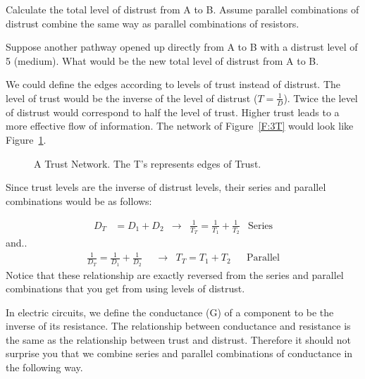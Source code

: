 \begin{blevel}
Calculate the total level of distrust from A to B. Assume parallel combinations of distrust combine the same way as parallel combinations of resistors.
\end{blevel}

\begin{clevel}
Suppose another pathway opened up directly from A to B with a distrust level of 5 (medium). What would be the new total level of distrust from A to B.
\end{clevel}

We could define the edges according to levels of trust instead of distrust. The level of trust would be the inverse of the level of distrust ($T=\frac{1}{D}$). Twice the level of distrust would correspond to half the level of trust. Higher trust leads to a more effective flow of information. The network of Figure~\ref{F:3T} would look like Figure~\ref{F:3T2}.
 
\begin{figure}[H]
\begin{center}
\caption{A Trust Network. The T's represents edges of Trust.}
\label{F:3T2}
\end{center}
\end{figure}

Since trust levels are the inverse of distrust levels, their series and parallel combinations would be as follows:

\begin{align}
D_T&=D_1+D_2&\rightarrow&\frac{1}{T_T}=\frac{1}{T_1}+\frac{1}{T_2}&\text{Series}
\end{align}
and..
\begin{align}
\frac{1}{D_T}=\frac{1}{D_1}+\frac{1}{D_2}&&\rightarrow&T_T=T_1+T_2&&\text{Parallel}
\end{align}
Notice that these relationship are exactly reversed from the series and parallel combinations that you get from using levels of distrust.\par
In electric circuits, we define the conductance (G) of a component to be the inverse of its resistance. The relationship between conductance and resistance is the same as the relationship between trust and distrust. Therefore it should not surprise you that we combine series and parallel combinations of conductance in the following way.

